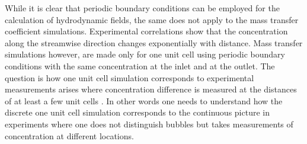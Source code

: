 \documentclass{article}
\begin{document}
While it is clear that periodic boundary conditions can be employed for the calculation
 of hydrodynamic fields, the same does not apply to the mass transfer coefficient
simulations. Experimental correlations \cite{bercic-mass} show that the
concentration along the streamwise direction changes exponentially with distance.
Mass transfer simulations however, are made only for one unit cell
using periodic boundary conditions with the same concentration at the inlet
and at the outlet. The question is how one unit cell simulation corresponds to
experimental measurements arises where concentration difference is measured at
the distances of at least a few unit cells \cite{bercic-mass}. In
other words one needs to understand how the discrete one unit cell simulation
corresponds to the continuous picture in experiments where one does not
distinguish bubbles but takes measurements of concentration at different
locations.
\end{document}
